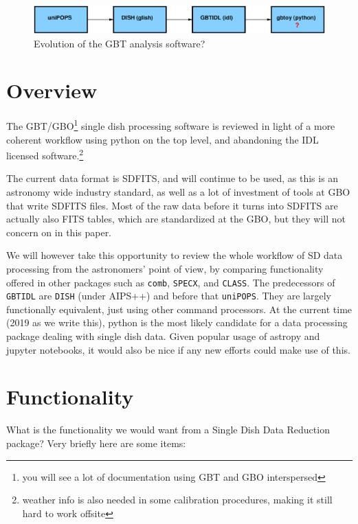 \documentclass[12pt,a4paper]{article}
\begin{document}
\begin{figure}[h]
\centering
  \includegraphics[width=\textwidth]{fig1.eps}
\caption{\label{fig1} Evolution of the GBT analysis software?}
\end{figure}


\section{Overview}

The GBT/GBO\footnote{you will see a lot of documentation using GBT and
  GBO interspersed} single dish processing software is reviewed in
light of a more coherent workflow using python on the top level, and
abandoning the IDL licensed software.\footnote{weather info is also
  needed in some calibration procedures, making it still hard to work
  offsite}

The current data format is SDFITS, and will continue to be used, as
this is an astronomy wide industry standard, as well as a lot of
investment of tools at GBO that write SDFITS files. Most of the raw
data before it turns into SDFITS are actually also FITS tables, which
are standardized at the GBO, but they will not concern on in this
paper.

We will however take this opportunity to review the whole workflow of
SD data processing from the astronomers' point of view, by
comparing functionality offered in other packages such as {\tt comb},
{\tt SPECX}, and {\tt CLASS}. The predecessors of {\tt GBTIDL} are
{\tt DISH} (under AIPS++) and before that {\tt uniPOPS}. They are
largely functionally equivalent, just using other command
processors. At the current time (2019 as we write this), python is the
most likely candidate for a data processing package dealing with
single dish data. Given popular usage of astropy and jupyter
notebooks, it would also be nice if any new efforts could make use of
this.

\section{Functionality}


What is the functionality we would want from a Single Dish Data Reduction
package? Very briefly here are some items:
\end{document}
